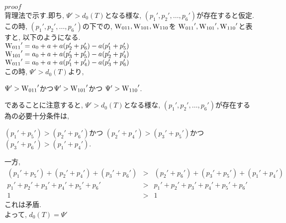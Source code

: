 \documentclass[12pt]{jsarticle}
\begin{document}
$proof$\\
背理法で示す.即ち, $\Psi' > d_0(T)$となる様な, $(p_1',p_2',\ldots,p_6')$が存在すると仮定.\\
この時, $(p_1',p_2',\ldots,p_6')$の下での,  ${\rm W}_{011}, {\rm W}_{101}, {\rm W}_{110}$を
${\rm W_{011}}',{\rm W_{101}}',{\rm W_{110}}'$と表すと, 以下のようになる.\\
${\rm W_{011}}'=a_0+a+a(p_2'+p_6')-a(p_1'+p_5')$\\
${\rm W_{101}}'=a_0+a+a(p_3'+p_5')-a(p_2'+p_4')$\\
${\rm W_{011}}'=a_0+a+a(p_1'+p_4')-a(p_3'+p_6')$\\
この時,  $\Psi' > d_0(T)$より,
\begin{center}
 $\Psi' >{\rm W_{011}}' $かつ$\Psi' > {\rm W_{101}}'$かつ $\Psi' >{\rm W_{110}}' $.
\end{center}
であることに注意すると, $\Psi' > d_0(T)$となる様な, $(p_1',p_2',\ldots,p_6')$が存在する為の必要十分条件は,
\begin{center}
 $(p_1'+p_5') >(p_2'+p_6') $かつ $(p_2'+p_4') >(p_3'+p_5') $かつ  $(p_3'+p_6') >(p_1'+p_4') $.
\end{center}
一方,
\begin{eqnarray*}
(p_1'+p_5') +(p_2'+p_4') +(p_3'+p_6')&>&(p_2'+p_6') +(p_3'+p_5')+(p_1'+p_4')\\
p_1'+p_2'+p_3'+p_4'+p_5'+p_6'&>&p_1'+p_2'+p_3'+p_4'+p_5'+p_6' \\
1&>&1
\end{eqnarray*}
これは矛盾.\\
よって, $d_0(T)=\Psi'$\\\\
\end{document}
